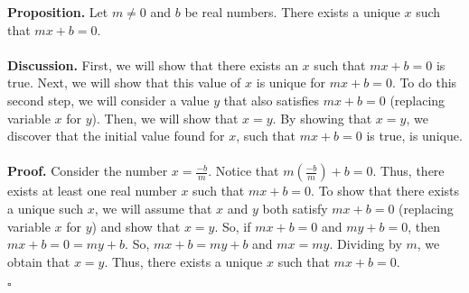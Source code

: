 \documentclass[12pt]{exam}
\begin{document}
\begin{questions}


\question
\textbf{Proposition.} Let $m \neq 0$ and $b$ be real numbers. There exists a unique $x$ such that $mx+b=0$.
\\
\\\textbf{Discussion.} First, we will show that there exists an $x$ such that $mx+b=0$ is true. Next, we will show that this value of $x$ is unique for $mx+b=0$. To do this second step, we will consider a value $y$ that also satisfies $mx+b=0$ (replacing variable $x$ for $y$). Then, we will show that $x=y$. By showing that $x=y$, we discover that the initial value found for $x$, such that $mx+b=0$ is true, is unique.
\\
\\\textbf{Proof.} Consider the number $ x = \frac{-b}{m}$. Notice that $m(\frac{-b}{m}) +b = 0$. Thus, there exists at least one real number $x$ such that $mx+b=0$. To show that there exists a unique such $x$, we will assume that $x$ and $y$ both satisfy $mx+b=0$ (replacing variable $x$ for $y$) and show that $x=y$. So, if $mx+b=0$ and $my+b=0$, then $mx+b=0=my+b$. So, $mx+b=my+b$ and $mx=my$. Dividing by $m$, we obtain that $x=y$. Thus, there exists a unique $x$ such that $mx+b=0$.
\begin{flushright}
$\square$
\end{flushright}


\end{questions}
\end{document}

